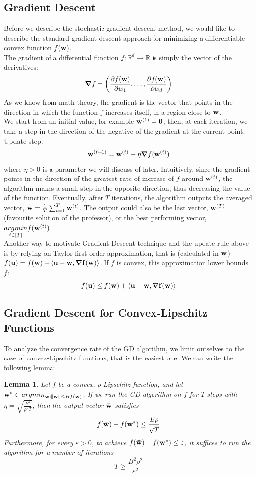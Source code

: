 \documentclass[12pt]{report}
\theoremstyle{plain}
\newtheorem{lemma}{Lemma}[chapter]
\newcommand\sprod[2]{\langle \vb{#1},\vb{#2}\rangle}
\begin{document}
\begin{flushleft}
\section{Gradient Descent} 
Before we describe the stochastic gradient descent method, we would like to
describe the standard gradient descent approach for minimizing a differentiable
convex function $f(\vb{w})$.\\
The gradient of a differential function $f:\mathds{R}^d\to\mathds{R}$ is simply the vector of the derivatives:
\[ \grad{f} = \left(\pdv{f(\vb{w})}{w_1},\dots,\pdv{f(\vb{w})}{w_d} \right) \]
As we know from math theory, the gradient is the vector that points in the direction in which the function $f$ increases itself, in a region close to $\vb{w}$.\\
We start from an initial value, for example $\vb{w}^{(1)}=\vb{0}$, then, at each iteration, we take a step in the direction of the negative of the gradient at the current point. Update step:
\[ \vb{w}^{(t+1)}=\vb{w}^{(t)}+\eta\grad{f}(\vb{w}^{(t)}) \]
where $\eta>0$ is a parameter we will discuss of later. Intuitively, since the gradient points in the direction of the greatest rate of increase of $f$ around $\vb{w}^{(t)}$, the algorithm makes a small step in the opposite direction, thus decreasing the value of the
function. Eventually, after $T$ iterations, the algorithm outputs the averaged vector,
$\vb{\bar{w}}=\frac{1}{T}\sum_{t=1}^T \vb{w}^{(t)}$. The output could also be the last vector, $\vb{w}^{(T)}$ (favourite solution of the professor), or the best performing vector, $\underset{t\in[T]}{argmin} f(\vb{w}^{(t)})$.\\
Another way to motivate Gradient Descent technique and the update rule above is by relying on Taylor first order approximation, that is (calculated in $\vb{w}$) $f(\vb{u}) = f(\vb{w}) + \sprod{u-w}{\grad{f}(w)}$. If $f$ is convex, this approximation lower bounds $f$:
\[ f(\vb{u}) \leq f(\vb{w}) + \sprod{u-w}{\grad{f}(w)} \]

\subsection{Gradient Descent for Convex-Lipschitz Functions}
To analyze the convergence rate of the GD algorithm, we limit ourselves to the case
of convex-Lipschitz functions, that is the easiest one. We can write the following lemma:
\begin{lemma}
	Let $f$ be a convex, $\rho$-Lipschitz function, and let $\vb{w}^*\in argmin_{\vb{w}:\norm{\vb{w}}\leq B f(\vb{w})}$. If we run the GD algorithm on $f$ for $T$ steps with $\eta=\sqrt{\frac{B^2}{\rho^2 T}}$, then the output vector $\vb{\bar{w}}$ satisfies
	\[ f(\vb{\bar{w}})-f(\vb{w}^*) \leq \frac{B\rho}{\sqrt{T}} \]
	Furthermore, for every $\varepsilon>0$, to achieve $f(\vb{\bar{w}})-f(\vb{w}^*) \leq\varepsilon$, it suffices to run the algorithm for a number of iterations
	\[ T\geq\frac{B^2\rho^2}{\varepsilon^2}  \]
\end{lemma}


\end{flushleft}
\end{document}
